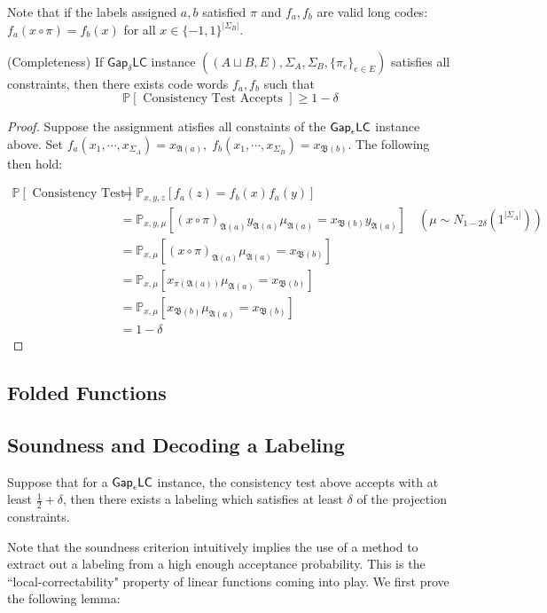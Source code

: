 Note that if the labels assigned $a,b$ satisfied $\pi$ and $f_a,f_b$ are valid long codes: $f_a(x \circ \pi) = f_b(x )$ for all $x \in \{-1,1\}^{|\Sigma_B|}$.

\begin{proposition} (Completeness)
  If $\mathsf{Gap}_\delta\mathsf{LC}$ instance $((A\sqcup B,E),\Sigma_A,\Sigma_B,\{\pi_e\}_{e \in E})$ satisfies all constraints, then there exists code words $f_a, f_b$ such that
  \begin{equation}
    \mathbb{P}[ \text{ Consistency Test Accepts } ] \geq 1 - \delta
  \end{equation}
\end{proposition}
\begin{proof}
  Suppose the assignment atisfies all constaints of the $\mathsf{Gap}_\epsilon\mathsf{LC}$ instance above. Set $f_a(x_1,\cdots, x_{\Sigma_A}) = x_{\mathfrak{A}(a)}, \; f_b(x_1,\cdots, x_{\Sigma_B}) = x_{\mathfrak{B}(b)}$. The following then hold:

  \begin{align*}
      \mathbb{P}[ \text{ Consistency Test Accepts } ] & = \mathbb{P}_{x,y,z}\left[f_a(z) = f_b(x)f_a(y) \right] \\
      & = \mathbb{P}_{x,y, \mu}\left[ (x \circ \pi)_{\mathfrak{A}(a)}y_{\mathfrak{A}(a)}\mu_{\mathfrak{A}(a)} = x_{\mathfrak{B}(b)}y_{\mathfrak{A}(a)}  \right] \quad (\mu \sim N_{1 - 2\delta}(1^{|\Sigma_A|})) \\
      & = \mathbb{P}_{x,\mu} \left[(x \circ \pi)_{\mathfrak{A}(a)}\mu_{\mathfrak{A}(a)} = x_{\mathfrak{B}(b)} \right] \\
      & =  \mathbb{P}_{x,\mu} \left[x_{\pi(\mathfrak{A}(a))}\mu_{\mathfrak{A}(a)} = x_{\mathfrak{B}(b)} \right]\\
      & =  \mathbb{P}_{x,\mu} \left[x_{\mathfrak{B}(b)}\mu_{\mathfrak{A}(a)} = x_{\mathfrak{B}(b)} \right] \\
      & = 1 - \delta
  \end{align*}
\end{proof}
%
%

\subsection{Folded Functions}

\subsection{Soundness and Decoding a Labeling}

\begin{proposition}
  Suppose that for a $\mathsf{Gap}_\epsilon\mathsf{LC}$ instance, the consistency test above accepts with at least $\frac{1}{2} + \delta$,  then there exists a labeling which satisfies at least $\delta$ of the projection constraints.
\end{proposition}
Note that the soundness criterion intuitively implies the use of a method to extract out a labeling from a high enough acceptance probability. This is the ``local-correctability" property of linear functions coming into play. We first prove the following lemma:

